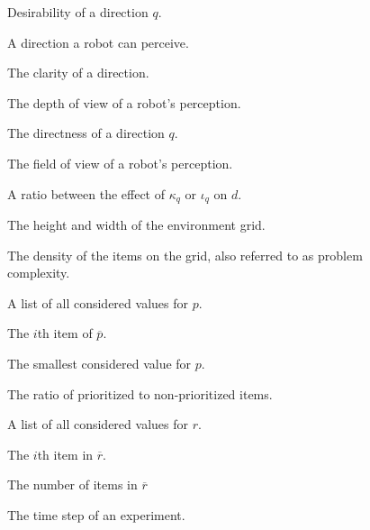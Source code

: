 \begin{description}
	\item[\parbox{\namewidth}{$d$}] Desirability of a direction $q$.
	\item[\parbox{\namewidth}{$q$}] A direction a robot can perceive.
	
	\item[\parbox{\namewidth}{$\kappa_q$}] The clarity of a direction.
	\item[\parbox{\namewidth}{$\eta$}] The depth of view of a robot's perception.

	\item[\parbox{\namewidth}{$\iota_q$}] The directness of a direction $q$.

	\item[\parbox{\namewidth}{$f$}] The	field of view of a robot's perception.
		
	\item[\parbox{\namewidth}{$\lambda$}] A ratio between the effect of $\kappa_q$ or $\iota_q$ on $d$.
	
	\item[\parbox{\namewidth}{$\Lambda$}] The height and width of the environment grid.

	\item[\parbox{\namewidth}{$p$}] The density of the items on the grid, also referred to as problem complexity.

	\item[\parbox{\namewidth}{$\overline{p}$}] A list of all considered values for $p$.

	\item[\parbox{\namewidth}{$p_i$}] The $i$th item of $\overline{p}$.

	\item[\parbox{\namewidth}{$p_{min}$}] The smallest considered value for $p$.
	
	
	\item[\parbox{\namewidth}{$r$}] The ratio of prioritized to non-prioritized items.

	\item[\parbox{\namewidth}{$\overline{r}$}] A list of all considered values for $r$.

	\item[\parbox{\namewidth}{$r_i$}] The $i$th item in $\overline{r}$.

	\item[\parbox{\namewidth}{$n_r$}] The number of items in $\overline{r}$	

	\item[\parbox{\namewidth}{$t$}] The time step of an experiment.	


\end{description}
